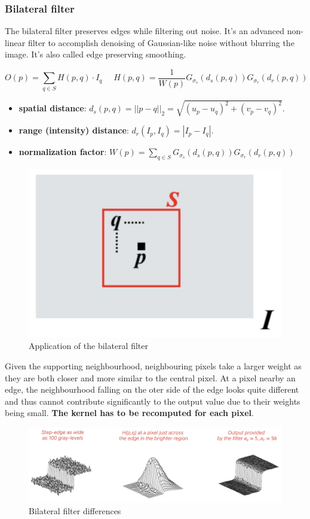 \documentclass{article}
\begin{document}
\subsubsection{Bilateral filter}

The bilateral filter preserves edges while filtering out noise.
It's an advanced non-linear filter to accomplish denoising of Gaussian-like noise without blurring the image.
It's also called edge preserving smoothing.

$$O(p) = \sum_{q\in S} H(p,q) \cdot I_q \,\,\,\,\,\,\,\, H(p,q) = \frac{1}{W(p)} G_{\sigma_s}(d_s(p,q))G_{\sigma_r}(d_r(p,q))$$

\begin{itemize}
  \item \textbf{spatial distance}: $d_s(p,q) = ||p-q||_2 = \sqrt{(u_p - u_q)^2 + (v_p - v_q)^2}$.
  \item \textbf{range (intensity) distance}: $d_r(I_p, I_q) = |I_p - I_q|$.
  \item \textbf{normalization factor}: $W(p) = \sum_{q \in S} G_{\sigma_s}(d_s(p,q))G_{\sigma_r}(d_r(p,q))$
\end{itemize}

\begin{figure}[htbp]
  \centering
  \includegraphics[width=0.7\linewidth]{./img/bilateral_filter_application.jpg}
  \caption{Application of the bilateral filter}
  \label{fig:bilateral_filter_application}
\end{figure}

Given the supporting neighbourhood, neighbouring pixels take a larger weight as they are both closer and more similar to the central pixel.
At a pixel nearby an edge, the neighbourhood falling on the oter side of the edge looks quite different and thus cannot contribute significantly to the output value due to their weights being small.
\textbf{The kernel has to be recomputed for each pixel}.

\begin{figure}[htbp]
  \centering
  \includegraphics[width=0.7\linewidth]{./img/bilateral_filter.jpg}
  \caption{Bilateral filter differences}
  \label{fig:bilateral_filter}
\end{figure}
\end{document}
